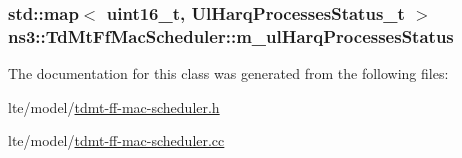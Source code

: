 \subsubsection[{\texorpdfstring{m\+\_\+ul\+Harq\+Processes\+Status}{m_ulHarqProcessesStatus}}]{\setlength{\rightskip}{0pt plus 5cm}std\+::map$<$ uint16\+\_\+t, {\bf Ul\+Harq\+Processes\+Status\+\_\+t} $>$ ns3\+::\+Td\+Mt\+Ff\+Mac\+Scheduler\+::m\+\_\+ul\+Harq\+Processes\+Status\hspace{0.3cm}{\ttfamily [private]}}\hypertarget{classns3_1_1TdMtFfMacScheduler_a0a4599be9db713d937b6d524a8546f19}{}\label{classns3_1_1TdMtFfMacScheduler_a0a4599be9db713d937b6d524a8546f19}


The documentation for this class was generated from the following files\+:\begin{DoxyCompactItemize}
\item 
lte/model/\hyperlink{lte_2model_2tdmt-ff-mac-scheduler_8h}{tdmt-\/ff-\/mac-\/scheduler.\+h}\item 
lte/model/\hyperlink{lte_2model_2tdmt-ff-mac-scheduler_8cc}{tdmt-\/ff-\/mac-\/scheduler.\+cc}\end{DoxyCompactItemize}
